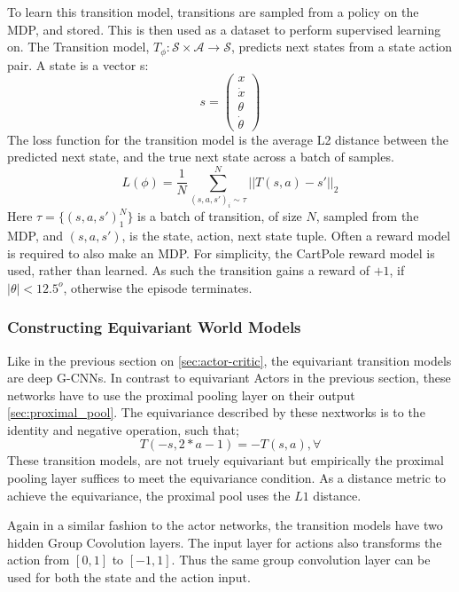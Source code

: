 To learn this transition model, transitions are sampled from a policy on the MDP, and stored. This is then used as a dataset to perform supervised learning on. The Transition model, $T_\phi: \mathcal{S} \times \mathcal{A} \rightarrow \mathcal{S}$, predicts next states from a state action pair. A state is a vector s:
\begin{equation}
	s = \begin{pmatrix}
		x       \\
		\dot{x} \\
		\theta  \\
		\dot{\theta}
	\end{pmatrix}
\end{equation}
The loss function for the transition model is the average L2 distance between the predicted next state, and the true next state across a batch of samples.
\begin{equation}
	L(\phi) = \frac{1}{N}\sum^N_{(s, a, s')_i \sim \mathcal \tau} ||T(s, a) - s'||_2
\end{equation}
Here $\tau = \{(s, a , s')_1^N\}$ is a batch of transition, of size $N$, sampled from the MDP, and $(s, a, s')$, is the state, action, next state tuple. Often a reward model is required to also make an MDP. For simplicity, the CartPole reward model is used, rather than learned. As such the transition gains a reward of $+1$, if $|\theta| < 12.5^o$, otherwise the episode terminates.

\subsubsection{Constructing Equivariant World Models}
Like in the previous section on \ref{sec:actor-critic}, the equivariant transition models are deep G-CNNs. In contrast to equivariant Actors in the previous section, these networks have to use the proximal pooling layer on their output \ref{sec:proximal_pool}. The equivariance described by these nextworks is to the identity and negative operation, such that;
\begin{equation}
	T(- s, 2*a - 1) =  -T(s, a), \forall
\end{equation}
These transition models, are not truely equivariant but empirically the proximal pooling layer suffices to meet the equivariance condition. As a distance metric to achieve the equivariance, the proximal pool uses the $L1$ distance.

Again in a similar fashion to the actor networks, the transition models have two hidden Group Covolution layers. The input layer for actions also transforms the action from $[0, 1]$ to $[-1, 1]$. Thus the same group convolution layer can be used for both the state and the action input.


